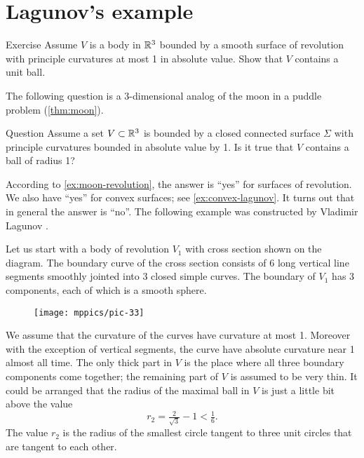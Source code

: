 \section*{Lagunov's example}

\begin{thm}{Exercise}\label{ex:moon-revolution}
Assume $V$ is a body in $\mathbb{R}^3$ bounded by a smooth surface of revolution with principle curvatures at most 1 in absolute value.
Show that $V$ contains a unit ball.
\end{thm}

The following question is a 3-dimensional analog of the moon in a puddle problem (\ref{thm:moon}).

\begin{thm}{Question}\label{quest:lagunov}
Assume a set $V\subset \mathbb{R}^3$ is bounded by a closed connected surface $\Sigma$ with 
principle curvatures bounded in absolute value by 1.
Is it true that $V$ contains a ball of radius 1?
\end{thm}

According to \ref{ex:moon-revolution}, the answer is ``yes'' for surfaces of revolution.
We also have ``yes'' for convex surfaces; see \ref{ex:convex-lagunov}.
It turns out that in general the answer is  ``no''.
The following example was constructed by Vladimir Lagunov \cite{lagunov}.


Let us start with a body of revolution $V_1$ with cross section shown on the diagram.
The boundary curve of the cross section consists of 6 long vertical line segments smoothly jointed into 3 closed simple curves. 
The boundary of $V_1$ has 3 components, each of which is a smooth sphere.

\begin{figure}[h!]%
\centering
\texttt{[image: mppics/pic-33]}
\vskip0mm
\end{figure}

We assume that the curvature of the curves have curvature at most 1.
Moreover with the exception of vertical segments, the curve have absolute curvature near 1 almost all time.
The only thick part in $V$ is the place where all three boundary components come together;
the remaining part of $V$ is assumed to be very thin.
It could be arranged that the radius of the maximal ball in $V$ is just a little bit above the value
\[r_2=\tfrac2{\sqrt{3}}-1< \tfrac16.\]
The value $r_2$ is the radius of the smallest circle tangent to three unit circles that are tangent to each other.

